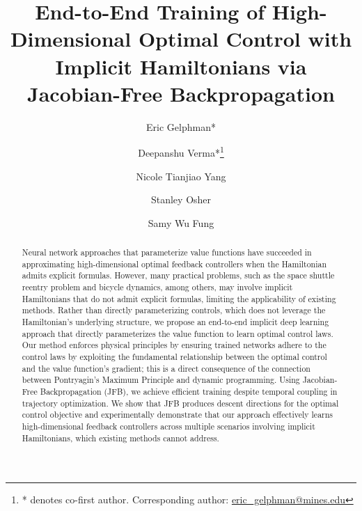 \documentclass[letterpaper, 10 pt, conference]{ieeeconf}  %
\title{\LARGE \bf
End-to-End Training of High-Dimensional Optimal Control with Implicit Hamiltonians via Jacobian-Free Backpropagation}
\author{%
    Eric Gelphman*
    \and
    Deepanshu Verma*\thanks{* denotes co-first author. Corresponding author: \url{eric_gelphman@mines.edu}}
    \and
    Nicole Tianjiao Yang 
    \and
    Stanley Osher 
    \and 
    Samy Wu Fung
}
\begin{document}
\maketitle
\begin{abstract}
    Neural network approaches that parameterize value functions have succeeded in approximating high-dimensional optimal feedback controllers when the Hamiltonian admits explicit formulas. 
    However, many practical problems, such as the space shuttle reentry problem and bicycle dynamics, among others, may involve implicit Hamiltonians that do not admit explicit formulas, limiting the applicability of existing methods. 
    Rather than directly parameterizing controls, which does not leverage the Hamiltonian's underlying structure, we propose an end-to-end implicit deep learning approach that directly parameterizes the value function to learn optimal control laws. Our method enforces physical principles by ensuring trained networks adhere to the control laws by exploiting the fundamental relationship between the optimal control and the value function's gradient; this is a direct consequence of the connection between Pontryagin's Maximum Principle and dynamic programming. Using Jacobian-Free Backpropagation (JFB), we achieve efficient training despite temporal coupling in trajectory optimization. We show that JFB produces descent directions for the optimal control objective and experimentally demonstrate that our approach effectively learns high-dimensional feedback controllers across multiple scenarios involving implicit Hamiltonians, which existing methods cannot address.
\end{abstract}

\thispagestyle{empty}
\pagestyle{empty}







%
\end{document}
